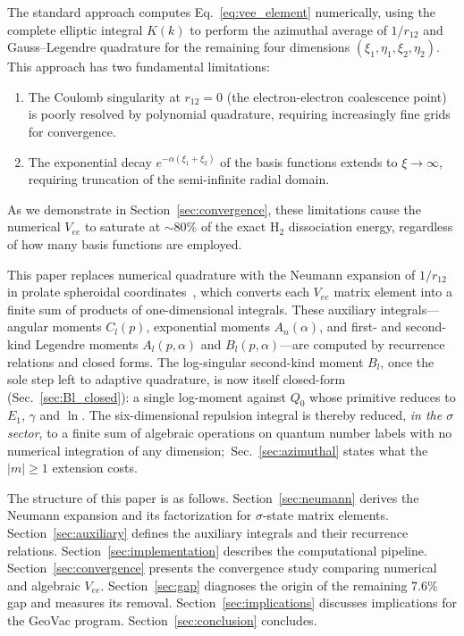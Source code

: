 \documentclass[aps,pra,twocolumn,superscriptaddress,longbibliography]{revtex4-2}
\begin{document}
The standard approach computes Eq.~\eqref{eq:vee_element}
numerically, using the complete elliptic integral $K(k)$ to perform
the azimuthal average of $1/r_{12}$ and Gauss--Legendre quadrature
for the remaining four dimensions $(\xi_1, \eta_1, \xi_2, \eta_2)$.
This approach has two fundamental limitations:
\begin{enumerate}
  \item The Coulomb singularity at $r_{12} = 0$ (the
    electron-electron coalescence point) is poorly resolved by
    polynomial quadrature, requiring increasingly fine grids for
    convergence.
  \item The exponential decay $e^{-\alpha(\xi_1 + \xi_2)}$ of the
    basis functions extends to $\xi \to \infty$, requiring
    truncation of the semi-infinite radial domain.
\end{enumerate}
As we demonstrate in Section~\ref{sec:convergence}, these
limitations cause the numerical $V_{ee}$ to saturate at $\sim$80\%
of the exact H$_2$ dissociation energy, regardless of how many
basis functions are employed.

This paper replaces numerical quadrature with the Neumann
expansion of $1/r_{12}$ in prolate spheroidal
coordinates~\cite{Neumann1878, Roothaan1951, Ruedenberg1951},
which converts each $V_{ee}$ matrix element into a finite
sum of products of one-dimensional integrals.  These auxiliary
integrals---angular moments $C_l(p)$, exponential moments
$A_n(\alpha)$, and first- and second-kind Legendre moments
$A_l(p,\alpha)$ and $B_l(p,\alpha)$---are computed by recurrence
relations and closed forms.  The log-singular second-kind moment
$B_l$, once the sole step left to adaptive quadrature, is now itself
closed-form (Sec.~\ref{sec:Bl_closed}): a single log-moment against
$Q_0$ whose primitive reduces to $E_1$, $\gamma$ and $\ln$.  The
six-dimensional repulsion integral is thereby reduced, \emph{in the
$\sigma$ sector}, to a finite sum of algebraic operations on quantum
number labels with no numerical integration of any dimension;\
Sec.~\ref{sec:azimuthal} states what the $|m| \ge 1$ extension costs.

The structure of this paper is as follows.
Section~\ref{sec:neumann} derives the Neumann expansion and
its factorization for $\sigma$-state matrix elements.
Section~\ref{sec:auxiliary} defines the auxiliary integrals
and their recurrence relations.
Section~\ref{sec:implementation} describes the computational
pipeline.  Section~\ref{sec:convergence} presents the
convergence study comparing numerical and algebraic $V_{ee}$.
Section~\ref{sec:gap} diagnoses the origin of the remaining
7.6\% gap and measures its removal.  Section~\ref{sec:implications} discusses
implications for the GeoVac program.
Section~\ref{sec:conclusion} concludes.
\end{document}
